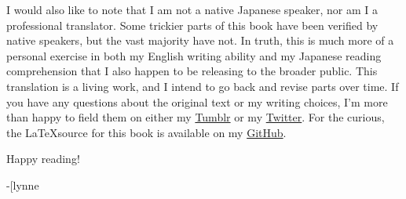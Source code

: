 I would also like to note that I am not a native Japanese speaker, nor am I a professional translator. Some trickier parts of this book have been verified by native speakers, but the vast majority have not. In truth, this is much more of a personal exercise in both my English writing ability and my Japanese reading comprehension that I also happen to be releasing to the broader public. This translation is a living work, and I intend to go back and revise parts over time. If you have any questions about the original text or my writing choices, I'm more than happy to field them on either my \href{https://plvpwaa.tumblr.com}{Tumblr} or my \href{https://twitter.com/plvpwaa}{Twitter}. For the curious, the \LaTeX \space source for this book is available on my \href{https://github.com/Spirati/translation-octopath}{GitHub}. 

Happy reading!

-[lynne